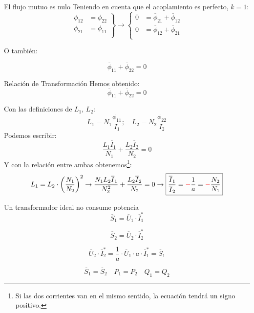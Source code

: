 \documentclass[aspectratio=169, usenames,svgnames,dvipsnames]{beamer}
\begin{document}
\begin{frame}[label={sec:orgfe3226b}]{El flujo mutuo es nulo}
Teniendo en cuenta que el acoplamiento es perfecto, \(k = 1\):
\[
  \left.
    \begin{array}{ll}
      \phi_{12} &= \phi_{22}\\
      \phi_{21} &= \phi_{11}\\
    \end{array} \right\} 
  \rightarrow
  \left\{
    \begin{array}{ll}
      0 &= \overline{\phi}_{21} + \overline{\phi}_{12}\\
      0 &= \overline{\phi}_{12} + \overline{\phi}_{21}\\
    \end{array}\right.
\]

O también:

\[
  \boxed{\overline{\phi}_{11} + \overline{\phi}_{22} = 0}
\]
\end{frame}
\begin{frame}[label={sec:org12d2519}]{Relación de Transformación}
Hemos obtenido:
\[
  \overline{\phi}_{11} + \overline{\phi}_{22} = 0
\]

Con las definiciones de \(L_1\), \(L_2\):
\[
  L_1 = N_1 \frac{\phi_{11}}{I_1}; \quad L_2 = N_2 \frac{\phi_{22}}{I_2}
\]
Podemos escribir:
\[
  \frac{L_1 \overline{I}_1}{N_1} + \frac{L_2 \overline{I}_2}{N_2} = 0
\]
Y con la relación entre ambas obtenemos\footnote{Si las dos corrientes van en el mismo sentido, la ecuación tendrá un signo positivo.}:
\[
  L_1 = L_2 \cdot \left(\frac{N_1}{N_2}\right)^2
  \rightarrow
  \frac{N_1L_2 \overline{I}_1}{N^2_2} + \frac{L_2 \overline{I}_2}{N_2} = 0
  \rightarrow
  \boxed{\frac{\overline{I}_1}{\overline{I}_2} = {\color{red}-} \frac{1}{a} = {\color{red}-} \frac{N_2}{N_1}}
\]
\end{frame}
\begin{frame}[label={sec:orgcb51a6f}]{Un transformador ideal no consume potencia}
\[
  \overline{S}_1 = \overline{U}_1 \cdot \overline{I}_1^*
\]

\[
  \overline{S}_2 = \overline{U}_2 \cdot \overline{I}_2^* 
\]

\[
  \overline{U}_2 \cdot \overline{I}_2^* = \frac{1}{a} \cdot \overline{U}_1 \cdot a \cdot \overline{I}_1^* = \overline{S}_1
\]

\[
  \boxed{\overline{S}_1 = \overline{S}_2}
  \quad
  \boxed{P_1 = P_2}
  \quad
  \boxed{Q_1 = Q_2}
\]
\end{frame}
\end{document}
